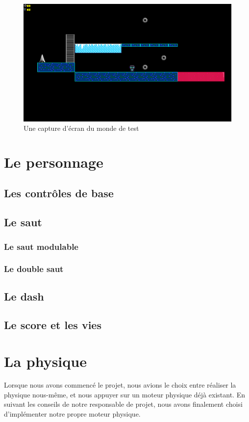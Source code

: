 \documentclass[10pt]{report}
\begin{document}
\begin{figure}[H]
  \centering
  \includegraphics[width=\textwidth]{images/test_world.png}
  \caption{Une capture d'écran du monde de test}
  \label{fig:test_world}
\end{figure}

\section{Le personnage}
\subsection{Les contrôles de base}
\subsection{Le saut}
\subsubsection{Le saut modulable}
\subsubsection{Le double saut}
\subsection{Le dash}
\subsection{Le score et les vies}

\section{La physique}
Lorsque nous avons commencé le projet, nous avions le choix entre réaliser la physique nous-même, et nous appuyer sur un moteur physique déjà existant.
En suivant les conseils de notre responsable de projet, nous avons finalement choisi d'implémenter notre propre moteur physique.\par
\end{document}
